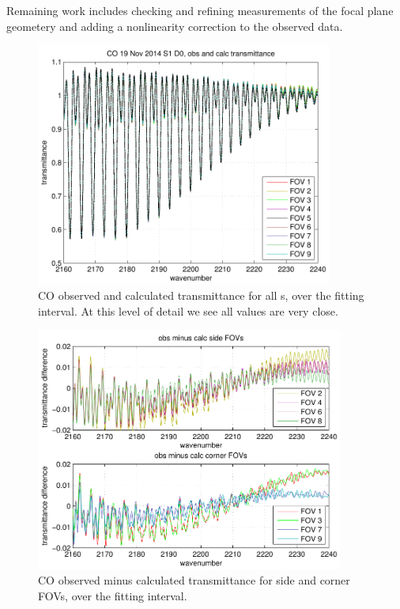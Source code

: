 \documentclass[12pt]{article}
\begin{document}
Remaining work includes checking and refining measurements of the
focal plane geometery and adding a nonlinearity correction to the
observed data.

\newpage


\begin{figure}
  \centering
  \includegraphics[height=8cm]{figures/CO_obs_and_calc.pdf}
  \caption{CO observed and calculated transmittance for all {\fov}s,
    over the fitting interval.  At this level of detail we see all
    values are very close.}
\end{figure}


\begin{figure}
  \centering
  \includegraphics[height=8cm]{figures/CO_breakout_2.pdf}
  \caption{CO observed minus calculated transmittance for side and
    corner FOVs, over the fitting interval.}
\end{figure}
\end{document}
